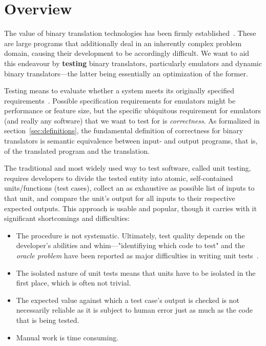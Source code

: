 \chapter{Overview}

The value of binary translation technologies has been firmly established~\cite{altman2000welcome, sites1993binary,
probst2002dynamic}. These are large programs that additionally deal in an inherently complex problem domain, causing
their development to be accordingly difficult. We want to aid this endeavour by \textbf{testing} binary translators,
particularly emulators and dynamic binary translators---the latter being essentially an optimization of the former.

Testing means to evaluate whether a system meets its originally specified requirements~\cite{jamil2016software_testing}.
Possible specification requirements for emulators might be performance or feature size, but the specific ubiquitous
requirement for emulators (and really any software) that we want to test for is \textit{correctness}. As formalized in
section~\ref{sec:definitions}, the fundamental definition of correctness for binary translators is semantic equivalence
between input- and output programs, that is, of the translated program and the translation.

The traditional and most widely used way to test software, called unit testing, requires developers to divide the tested
entity into atomic, self-contained units/functions (test cases), collect an as exhaustive as possible list of inputs to
that unit, and compare the unit's output for all inputs to their respective expected outputs. This approach is usable
and popular, though it carries with it significant shortcomings and difficulties:

\begin{itemize}
    \item The procedure is not systematic. Ultimately, test quality depends on the developer's abilities and
        whim---"identifiying which code to test" and the \textit{oracle problem} have been reported as major
        difficulties in writing unit tests~\cite{Daka+2014UnitTestingSurvey}.
    \item The isolated nature of unit tests means that units have to be isolated in the first place, which is often not
        trivial.
    \item The expected value against which a test case's output is checked is not necessarily reliable as it is subject
        to human error just as much as the code that is being tested.
    \item Manual work is time consuming.
\end{itemize}

